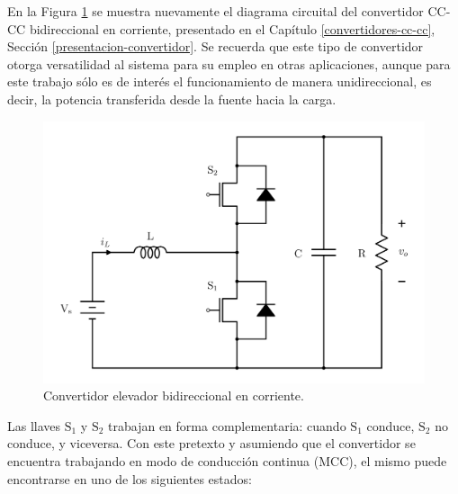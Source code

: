 En la Figura \ref{convertidor-bidireccional-diseno} se muestra nuevamente el diagrama circuital del convertidor CC-CC bidireccional en corriente, presentado en el Capítulo \ref{convertidores-cc-cc}, Sección \ref{presentacion-convertidor}. Se recuerda que este tipo de convertidor otorga versatilidad al sistema para su empleo en otras aplicaciones, aunque para este trabajo sólo es de interés el funcionamiento de manera unidireccional, es decir, la potencia transferida desde la fuente hacia la carga.

\begin{figure}[hbt!]
  \centering
  \includegraphics[width=0.46\columnwidth]{Imágenes/Diseño del control/Convertidor bidireccional de corriente.pdf}
  \caption{Convertidor elevador bidireccional en corriente.}
  \label{convertidor-bidireccional-diseno}
\end{figure} 

Las llaves $\mathrm{S_1}$ y $\mathrm{S_2}$ trabajan en forma complementaria: cuando $\mathrm{S_1}$ conduce, $\mathrm{S_2}$ no conduce, y viceversa. Con este pretexto y asumiendo que el convertidor se encuentra trabajando en modo de conducción continua (MCC), el mismo puede encontrarse en uno de los siguientes estados:

